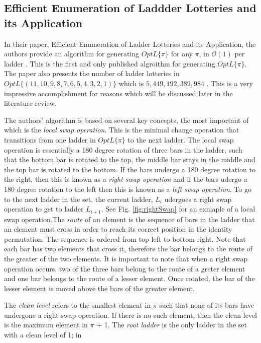 \subsection{Efficient Enumeration of Laddder Lotteries and its Application}
In their paper, Efficient Enumeration of Ladder Lotteries and its Application,
the authors provide an algorithm for generating $OptL\{\pi\}$ 
for any $\pi$, in $\mathcal{O}(1)$ per ladder \cite{A1}. This is the first and only 
published algroithm for generating $OptL\{\pi\}$. The paper also presents the number 
of ladder lotteries in $OptL\{(11, 10, 9, 8, 7, 6, 5, 4, 3, 2, 1)\}$ which is 
$5,449,192,389,984$ \cite{A1}. This is a very impressive accomplishment for reasons which 
will be discussed later in the literature review.\par 
The authors' algorithm is based on several key concepts, the most 
important of which is the \emph{local swap operation}. This is the 
minimal change operation that transitions from one ladder in $OptL\{\pi\}$ to the 
next ladder. The local swap operation is essentially a 180 degree rotation
of three bars in the ladder, such that the bottom
bar is rotated to the top, the middle bar stays in the middle and the top bar
is rotated to the bottom. If the bars undergo a 180 degree rotation to the right, 
then this is known as a \emph{right swap operation} and 
if the bars udergo a 180 degree rotation to the left then this 
is known as a \emph{left swap operation}. To go to the next ladder in the set, 
the current ladder, $L_{i}$ udergoes a right swap operation 
to get to ladder $L_{i+1}$. See Fig. \ref{fig:rightSwap} for an exmaple of a 
local swap operation.The \emph{route} of an element is the sequence of bars in the ladder that an element must cross in order to reach its correct position in 
the identity permutation. The sequence is ordered from top left to bottom right.
Note that each bar has two elements that cross it, 
therefore the bar belongs to the route of the greater of the two elements. 
It is important to note that when a right swap operation occurs, 
two of the three bars belong to the route of a greter element and one bar belongs
to the route of a lesser element. Once rotated, the bar of the lesser element is 
moved above the bars of the greater element.\par
The \emph{clean level} refers to the smallest element 
in $\pi$ such that none of its bars have undergone a right swap operation.
If there is no such element, then the clean level is the maximum element in $\pi$ + 1.
The \emph{root ladder} is the only ladder in  the set with a clean level of 1; in 
